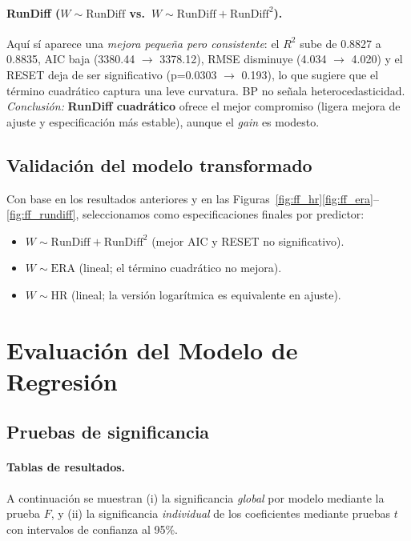 \documentclass[10pt]{article}
\begin{document}
    \paragraph{RunDiff (\(W \sim \text{RunDiff}\) vs.\ \(W \sim \text{RunDiff}+\text{RunDiff}^2\)).}
    Aquí sí aparece una \textit{mejora pequeña pero consistente}: el \(R^2\) sube de 0.8827 a 0.8835, AIC baja (3380.44 \(\rightarrow\) 3378.12), RMSE disminuye (4.034 \(\rightarrow\) 4.020) y el RESET deja de ser significativo (p=0.0303 \(\rightarrow\) 0.193), lo que sugiere que el término cuadrático captura una leve curvatura. BP no señala heterocedasticidad. 
    \textit{Conclusión:} \textbf{RunDiff cuadrático} ofrece el mejor compromiso (ligera mejora de ajuste y especificación más estable), aunque el \textit{gain} es modesto.

\subsection{Validación del modelo transformado}

    Con base en los resultados anteriores y en las Figuras~\ref{fig:ff_hr}\ref{fig:ff_era}--\ref{fig:ff_rundiff}, seleccionamos como especificaciones finales por predictor:
    \begin{itemize}
        \item \(W \sim \text{RunDiff} + \text{RunDiff}^2\) (mejor AIC y RESET no significativo).
        \item \(W \sim \text{ERA}\) (lineal; el término cuadrático no mejora).
        \item \(W \sim \text{HR}\) (lineal; la versión logarítmica es equivalente en ajuste).
    \end{itemize}
\section{Evaluación del Modelo de Regresión}
\subsection{Pruebas de significancia}
\paragraph{Tablas de resultados.}
A continuación se muestran (i) la significancia \emph{global} por modelo mediante la prueba \(F\), y (ii) la significancia 
\emph{individual} de los coeficientes mediante pruebas \(t\) con intervalos de confianza al 95\%.
\end{document}
